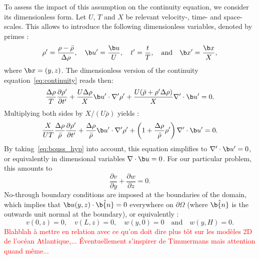 To assess the impact of this assumption on the continuity equation, we consider its dimensionless form. Let $U$, $T$ and $X$ be relevant velocity-, time- and space-scales. This allows to introduce the following dimensionless variables, denoted by primes :
\begin{equation}
	\rho' = \frac{\rho - \bar{\rho}}{\Delta \rho}, \quad \b u' = \frac{\b u}{U}, \quad t' = \frac{t}{T}, \quad \mbox{and} \quad \b x' = \frac{\b x}{X},
\end{equation}
where $\b x = (y,z)$. The dimensionless version of the continuity equation~\eqref{eq:continuity} reads then: 
\begin{equation}
	\frac{\Delta \rho}{T}\frac{\partial \rho'}{\partial t'} + \frac{U\Delta \rho}{X}\b u' \cdot \nabla' \rho' + \frac{U(\bar{\rho}+ \rho' \Delta \rho)}{X}\nabla' \cdot \b u' = 0.
\end{equation}
Multiplying both sides by $X/(U\bar{\rho})$ yields :
\begin{equation}
	\frac{X}{UT}\frac{\Delta \rho}{\bar{\rho}}\frac{\partial \rho'}{\partial t'} + \frac{\Delta \rho}{\bar{\rho}}\b u' \cdot \nabla' \rho' + \left(1+\frac{\Delta \rho}{\bar{\rho}}\rho'\right)\nabla' \cdot \b u' = 0.
\end{equation}
By taking~\eqref{eq:bouss_hyp} into account, this equation simplifies to $\nabla' \cdot \b u' = 0$, or equivalently in dimensional variables $\nabla \cdot \b u = 0$. For our particular problem, this amounts to
\begin{equation}
	\frac{\partial v}{\partial y} + \frac{\partial w}{\partial z} = 0.
\end{equation}
No-through boundary conditions are imposed at the boundaries of the domain, which implies that $\b u(y,z) \cdot \hat{\b{n}} = 0$ everywhere on $\partial \Omega$ (where $\hat{\b{n}}$ is the outwards unit normal at the boundary), or equivalently :
\begin{equation} \label{eq:overturnerBC}
	v(0,z) = 0, \quad v(L,z) = 0, \quad w(y,0) = 0 \quad \mbox{and} \quad w(y,H) = 0.
\end{equation}
\textcolor{red}{Blahblah à mettre en relation avec ce qu'on doit dire plus tôt sur les modèles 2D de l'océan Atlantique,... Éventuellement s'inspirer de Timmermans mais attention quand même...}


